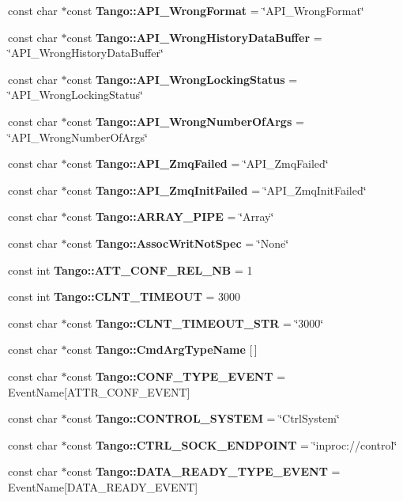 \begin{DoxyCompactItemize}
\item 
const char $\ast$const {\bf Tango\-::\-A\-P\-I\-\_\-\-Wrong\-Format} = \char`\"{}A\-P\-I\-\_\-\-Wrong\-Format\char`\"{}
\item 
const char $\ast$const {\bf Tango\-::\-A\-P\-I\-\_\-\-Wrong\-History\-Data\-Buffer} = \char`\"{}A\-P\-I\-\_\-\-Wrong\-History\-Data\-Buffer\char`\"{}
\item 
const char $\ast$const {\bf Tango\-::\-A\-P\-I\-\_\-\-Wrong\-Locking\-Status} = \char`\"{}A\-P\-I\-\_\-\-Wrong\-Locking\-Status\char`\"{}
\item 
const char $\ast$const {\bf Tango\-::\-A\-P\-I\-\_\-\-Wrong\-Number\-Of\-Args} = \char`\"{}A\-P\-I\-\_\-\-Wrong\-Number\-Of\-Args\char`\"{}
\item 
const char $\ast$const {\bf Tango\-::\-A\-P\-I\-\_\-\-Zmq\-Failed} = \char`\"{}A\-P\-I\-\_\-\-Zmq\-Failed\char`\"{}
\item 
const char $\ast$const {\bf Tango\-::\-A\-P\-I\-\_\-\-Zmq\-Init\-Failed} = \char`\"{}A\-P\-I\-\_\-\-Zmq\-Init\-Failed\char`\"{}
\item 
const char $\ast$const {\bf Tango\-::\-A\-R\-R\-A\-Y\-\_\-\-P\-I\-P\-E} = \char`\"{}Array\char`\"{}
\item 
const char $\ast$const {\bf Tango\-::\-Assoc\-Writ\-Not\-Spec} = \char`\"{}None\char`\"{}
\item 
const int {\bf Tango\-::\-A\-T\-T\-\_\-\-C\-O\-N\-F\-\_\-\-R\-E\-L\-\_\-\-N\-B} = 1
\item 
const int {\bf Tango\-::\-C\-L\-N\-T\-\_\-\-T\-I\-M\-E\-O\-U\-T} = 3000
\item 
const char $\ast$const {\bf Tango\-::\-C\-L\-N\-T\-\_\-\-T\-I\-M\-E\-O\-U\-T\-\_\-\-S\-T\-R} = \char`\"{}3000\char`\"{}
\item 
const char $\ast$const {\bf Tango\-::\-Cmd\-Arg\-Type\-Name} [$\,$]
\item 
const char $\ast$const {\bf Tango\-::\-C\-O\-N\-F\-\_\-\-T\-Y\-P\-E\-\_\-\-E\-V\-E\-N\-T} = Event\-Name[A\-T\-T\-R\-\_\-\-C\-O\-N\-F\-\_\-\-E\-V\-E\-N\-T]
\item 
const char $\ast$const {\bf Tango\-::\-C\-O\-N\-T\-R\-O\-L\-\_\-\-S\-Y\-S\-T\-E\-M} = \char`\"{}Ctrl\-System\char`\"{}
\item 
const char $\ast$const {\bf Tango\-::\-C\-T\-R\-L\-\_\-\-S\-O\-C\-K\-\_\-\-E\-N\-D\-P\-O\-I\-N\-T} = \char`\"{}inproc\-://control\char`\"{}
\item 
const char $\ast$const {\bf Tango\-::\-D\-A\-T\-A\-\_\-\-R\-E\-A\-D\-Y\-\_\-\-T\-Y\-P\-E\-\_\-\-E\-V\-E\-N\-T} = Event\-Name[D\-A\-T\-A\-\_\-\-R\-E\-A\-D\-Y\-\_\-\-E\-V\-E\-N\-T]

\end{DoxyCompactItemize}
